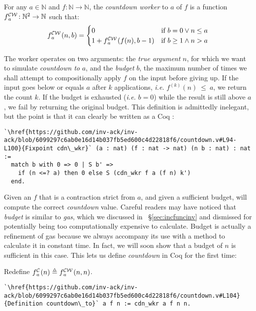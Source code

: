 \begin{defn} \label{defn: countdown-worker} \label{lem: cdt-init}
For any $a\in \mathbb{N}$ and $f: \mathbb{N}\to \mathbb{N}$, the \emph{countdown worker} to $a$ of $f$ is a function $\cdw{f}{a}\ : \mathbb{N}^2\to \mathbb{N}$ such that:
\begin{equation*}
\cdw{f}{a}(n, b) = \begin{cases}
0 & \text{if } b = 0 \vee n\le a \\ 1 +\cdw{f}{a}(f(n), b-1) & \text{if } b \ge 1 \wedge n > a
\end{cases}
\end{equation*}
\end{defn}
The worker operates on two arguments:
the \emph{true argument} $n$, for which we want to simulate
\emph{countdown to} $a$,
and the \emph{budget} $b$, the maximum number of times we shall attempt
to compositionally apply $f$ on the input before giving up.
If the input goes below or equals $a$ after $k$ applications, \emph{i.e.} $f^{(k)}(n)~\le~a$, we return the count $k$. If the budget is exhausted (\emph{i.e.} $b = 0$) while the result is still above $a$, we fail by returning the original budget. This definition is admittedly inelegant, but the point is that it can clearly be written as a Coq :
\begin{lstlisting}
`\href{https://github.com/inv-ack/inv-ack/blob/6099297c6ab0e16d14b037fb5ed600c4d22818f6/countdown.v#L94-L100}{Fixpoint cdn\_wkr}` (a : nat) (f : nat -> nat) (n b : nat) : nat :=
  match b with 0 => 0 | S b' =>
    if (n <=? a) then 0 else S (cdn_wkr f a (f n) k')
  end.
\end{lstlisting}
Given an $f$ that is a contraction strict from $a$,
and given a sufficient budget, 
will compute the correct \emph{countdown} value.
Careful readers may have noticed that \emph{budget} is similar to
\emph{gas}, which we discussed in ~\S\ref{sec:incfuncinv}
and dismissed for potentially
being too computationally expensive to calculate.
Budget is actually a refinement of gas because
we always accompany its use with a method to calculate it in constant time.
In fact, we will soon show that a budget of $n$ is sufficient in this case.
This lets us define \emph{countdown} in Coq for the first time:
\begin{defn} \label{defn: countdown}
Redefine $\cdt{f}{a}(n) \triangleq \cdw{f}{a}(n, n)$.
\begin{lstlisting}
`\href{https://github.com/inv-ack/inv-ack/blob/6099297c6ab0e16d14b037fb5ed600c4d22818f6/countdown.v#L104}{Definition countdown\_to}` a f n := cdn_wkr a f n n.
\end{lstlisting}
\vspace{-0.8em}
\end{defn}
